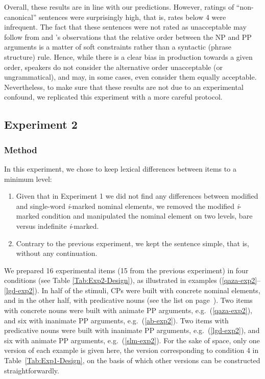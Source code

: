 \documentclass[output=paper]{langsci/langscibook}
\begin{document}
Overall, these results are in line with our predictions.  However,
ratings of ``non-canonical'' sentences were surprisingly high, that
is, rates below 4 were infrequent.  The fact that these sentences were
not rated as unacceptable may follow from \citet{FaghiriPhd} and
\citeauthor{FagSamHem2018}'s \citeyear{FagSamHem2018} observations
that the relative order between the NP and PP arguments is a matter of
soft constraints rather than a syntactic (phrase structure) rule.
Hence, while there is a clear bias in production towards a given
order, speakers do not consider the alternative order unacceptable (or
ungrammatical), and may, in some cases, even consider them equally
acceptable.  Nevertheless, to make sure that these results are not due
to an experimental confound, we replicated this experiment with a more
careful protocol.

\subsection{Experiment 2}
\subsubsection{Method}
In this experiment, we chose to keep lexical differences between items to a minimum level:
\begin{enumerate}
	\item Given that in Experiment 1 we did not find any differences between modified and single-word \textit{i}-marked nominal elements, we removed the modified \textit{i}-marked condition and manipulated the nominal element on two levels, bare versus indefinite \textit{i}-marked.
	
	\item Contrary to the previous experiment, we kept the sentence simple, that is, without any continuation. 
\end{enumerate}

We prepared 16 experimental items (15 from the previous experiment) in four conditions (see Table \ref{Tab:Exp2-Design}), as illustrated in examples (\ref{qaza-exp2}--\ref{lgd-exp2}). 
In half of the stimuli, CPs were built with concrete nominal elements, and in the other half, with predicative nouns (see the list on page~\pageref{ListCP}). 
Two items with concrete nouns were built with animate PP arguments, e.g.~(\ref{qaza-exp2}), and six with inanimate PP arguments, e.g.~(\ref{ab-exp2}). 
Two items with predicative nouns were built with inanimate PP arguments, e.g.~(\ref{lgd-exp2}), and six with animate PP arguments, e.g.~(\ref{slm-exp2}).   For the sake of space, only one version of each example is given here, the version corresponding to condition 4 in Table~\ref{Tab:Exp1-Design}, on the basis of which other versions can be constructed straightforwardly.
\end{document}
